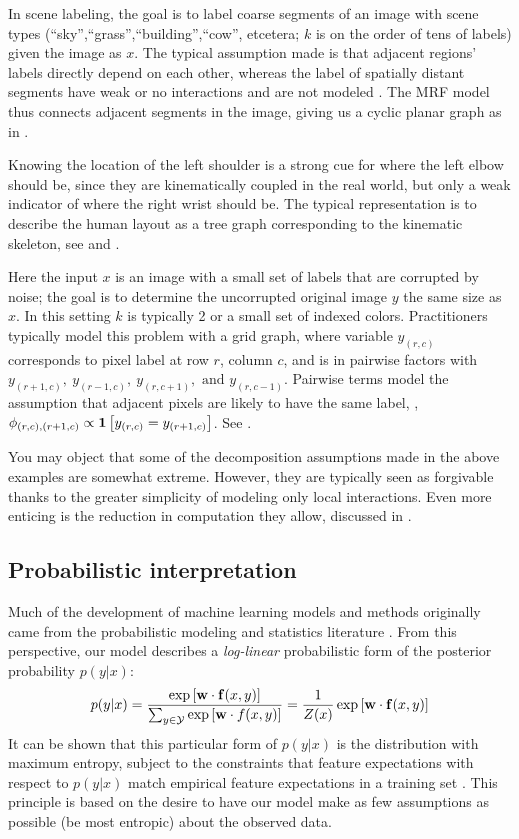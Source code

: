  In scene labeling, the goal is to label coarse segments 
of an image with scene types (``sky'',``grass'',``building'',``cow'', etcetera; 
$k$ is on the order of tens of labels) given the image as $x$. The typical 
assumption made is that adjacent regions' labels directly depend on each other, 
whereas the label of spatially distant segments have weak or no interactions 
and are not modeled \citep{cour05}.  The MRF model thus connects adjacent 
segments in the image, giving us a cyclic planar graph as in
.

  Knowing the location of the left shoulder is a 
strong cue for where the left elbow should be, since they are kinematically 
coupled in the real world, but only a weak indicator of where the right wrist 
should be.  The typical representation is to describe the human layout as a 
tree graph corresponding to the kinematic skeleton, see 
 and .


 Here the input $x$ is an image with a small set of 
labels that are corrupted by noise; the goal is to determine the uncorrupted 
original image $y$ the same size as $x$.  In this setting $k$ is typically 2 or 
a small set of indexed colors. Practitioners typically model this problem with 
a grid graph, where variable $y_{(r,c)}$ corresponds to pixel label at row $r$, 
column $c$, and is in pairwise factors with 
$y_{(r+1,c)},~y_{(r-1,c)},~y_{(r,c+1)}, \text{ and } y_{(r,c-1)}$.  Pairwise 
terms model the assumption that adjacent pixels are likely to have the same 
label, \eg, $\phi_{(r,c),(r+1,c)} \propto \mathbf{1}\left[y_{(r,c)} = y_{(r+1,c)}\right]$.  See 
.

You may object that some of the decomposition assumptions made in the above 
examples are somewhat extreme.  However, they are typically seen as forgivable 
thanks to the greater simplicity of modeling only local interactions. Even more 
enticing is the reduction in computation they allow, discussed in 
.

\subsection{Probabilistic interpretation}\label{sec:probinterp}
Much of the development of machine learning models and methods originally came 
from the probabilistic modeling and statistics literature 
\citep{koller-book,esl-book,bishop-book}.  From this perspective, our model 
describes a {\em log-linear} probabilistic form of the posterior probability 
$p(y|x)$:
\begin{equation}
p(y|x)= \frac{\exp \left[ \mathbf{w} \cdot \mathbf{f}(x,y) \right]}{\sum_{y \in \mathcal{Y}} \exp \left[\mathbf{w} \cdot f(x,y) \right]} = \frac{1}{Z(x)} \exp \left[ \mathbf{w} \cdot \mathbf{f}(x,y) \right]
\end{equation}
It can be shown that this particular form of $p(y|x)$ is the
distribution with maximum entropy, subject to the constraints that feature 
expectations with respect to $p(y|x)$ match empirical feature expectations in a 
training set \citep{jaynes1963}.  This principle is based on the desire to have 
our model make as few assumptions as possible (be most entropic) about the 
observed data.

